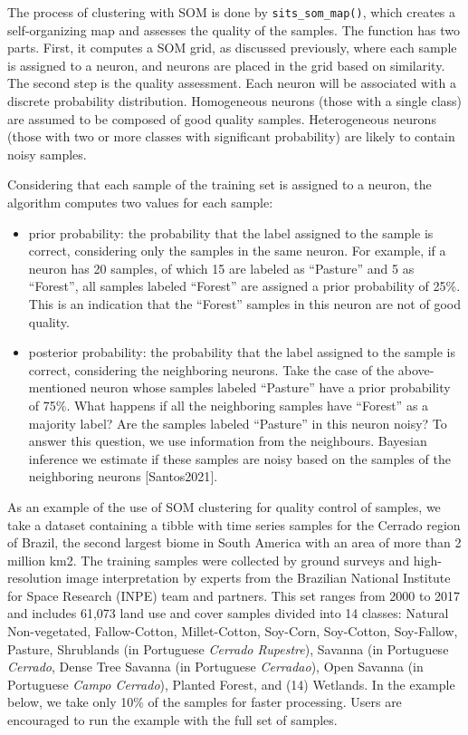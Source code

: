 \documentclass[a4paper,]{tufte-book}
\providecommand{\tightlist}{%
  \setlength{\itemsep}{0pt}\setlength{\parskip}{0pt}}
\begin{document}
The process of clustering with SOM is done by \texttt{sits\_som\_map()}, which creates a self-organizing map and assesses the quality of the samples. The function has two parts. First, it computes a SOM grid, as discussed previously, where each sample is assigned to a neuron, and neurons are placed in the grid based on similarity. The second step is the quality assessment. Each neuron will be associated with a discrete probability distribution. Homogeneous neurons (those with a single class) are assumed to be composed of good quality samples. Heterogeneous neurons (those with two or more classes with significant probability) are likely to contain noisy samples.

Considering that each sample of the training set is assigned to a neuron, the algorithm computes two values for each sample:

\begin{itemize}
\tightlist
\item
  prior probability: the probability that the label assigned to the sample is correct, considering only the samples in the same neuron. For example, if a neuron has 20 samples, of which 15 are labeled as ``Pasture'' and 5 as ``Forest'', all samples labeled ``Forest'' are assigned a prior probability of 25\%. This is an indication that the ``Forest'' samples in this neuron are not of good quality.
\item
  posterior probability: the probability that the label assigned to the sample is correct, considering the neighboring neurons. Take the case of the above-mentioned neuron whose samples labeled ``Pasture'' have a prior probability of 75\%. What happens if all the neighboring samples have ``Forest'' as a majority label? Are the samples labeled ``Pasture'' in this neuron noisy? To answer this question, we use information from the neighbours. Bayesian inference we estimate if these samples are noisy based on the samples of the neighboring neurons {[}Santos2021{]}.
\end{itemize}

As an example of the use of SOM clustering for quality control of samples, we take a dataset containing a tibble with time series samples for the Cerrado region of Brazil, the second largest biome in South America with an area of more than 2 million km2. The training samples were collected by ground surveys and high-resolution image interpretation by experts from the Brazilian National Institute for Space Research (INPE) team and partners. This set ranges from 2000 to 2017 and includes 61,073 land use and cover samples divided into 14 classes: Natural Non-vegetated, Fallow-Cotton, Millet-Cotton, Soy-Corn, Soy-Cotton, Soy-Fallow, Pasture, Shrublands (in Portuguese \textit{Cerrado Rupestre}), Savanna (in Portuguese \textit{Cerrado}, Dense Tree Savanna (in Portuguese \textit{Cerradao}), Open Savanna (in Portuguese \textit{Campo Cerrado}), Planted Forest, and (14) Wetlands. In the example below, we take only 10\% of the samples
for faster processing. Users are encouraged to run the example with the full
set of samples.
\end{document}
